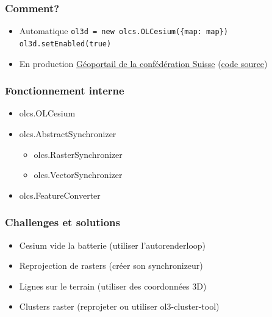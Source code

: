 \documentclass{beamer}
\begin{document}
  
  \begin{frame}
    \frametitle{Comment?}
    
    \begin{itemize}
      \item Automatique\newline
	    \texttt{ol3d = new olcs.OLCesium(\{map: map\})}\newline
	    \texttt{ol3d.setEnabled(true)}\newline
    \end{itemize}
    \pause
    \begin{itemize}
      \item En production\newline
      \href{https://map.geo.admin.ch/}{Géoportail de la confédération Suisse} (\href{https://github.com/geoadmin/mf-geoadmin3}{code source})
    \end{itemize}
  \end{frame}


   \begin{frame}
    \frametitle{Fonctionnement interne}
    \begin{itemize}
      \item olcs.OLCesium
        \pause
      \item olcs.AbstractSynchronizer
        \begin{itemize}
          \item olcs.RasterSynchronizer
          \item olcs.VectorSynchronizer
        \end{itemize}
        \pause
      \item olcs.FeatureConverter
    \end{itemize}
  \end{frame}


  \begin{frame}
    \frametitle{Challenges et solutions}
    \begin{itemize}
      \item Cesium vide la batterie (utiliser l'autorenderloop)
        \pause
      \item Reprojection de rasters (créer son synchronizeur)
        \pause
      \item Lignes sur le terrain (utiliser des coordonnées 3D)
        \pause
      \item Clusters raster (reprojeter ou utiliser ol3-cluster-tool)
     \end{itemize}
  \end{frame}
\end{document}
